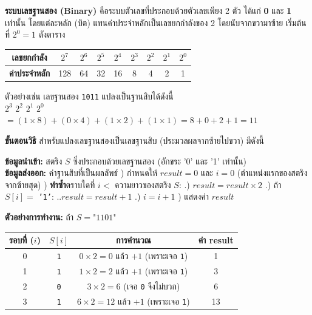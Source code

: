 \question \textbf{ระบบเลขฐานสอง (Binary)} คือระบบตัวเลขที่ประกอบด้วยตัวเลขเพียง 2 ตัว ได้แก่ \textbf{0} และ \textbf{1} เท่านั้น โดยแต่ละหลัก (บิต) แทนค่าประจำหลักเป็นเลขยกกำลังของ 2 โดยนับจากขวามาซ้าย เริ่มต้นที่ $2^0 = 1$ ดังตาราง

\begin{center}
\begin{tabular}{|c|*{8}{c|}}
\hline
\textbf{เลขยกกำลัง} & $2^7$ & $2^6$ & $2^5$ & $2^4$ & $2^3$ & $2^2$ & $2^1$ & $2^0$ \\
\hline
\textbf{ค่าประจำหลัก} & 128 & 64 & 32 & 16 & 8 & 4 & 2 & 1 \\
\hline
\end{tabular}
\end{center}

ตัวอย่างเช่น เลขฐานสอง \texttt{1011} แปลงเป็นฐานสิบได้ดังนี้ \\
\quad $2^3$\quad\;\; $2^2$\quad\;\; $2^1$\quad\;\; $2^0$ \\
\quad {}    \;\; $= (1 \times 8) + (0 \times 4) + (1 \times 2) + (1 \times 1) = 8 + 0 + 2 + 1 = 11$

\textbf{ขั้นตอนวิธี} สำหรับแปลงเลขฐานสองเป็นเลขฐานสิบ (ประมวลผลจากซ้ายไปขวา) มีดังนี้

\begin{pseudocode}
\textbf{ข้อมูลนำเข้า:} สตริง $S$ ซึ่งประกอบด้วยเลขฐานสอง (อักขระ '0' และ '1' เท่านั้น) \\
\textbf{ข้อมูลส่งออก:} ค่าฐานสิบที่เป็นผลลัพธ์
) กำหนดให้ $result = 0$ และ $i = 0$ (ตำแหน่งแรกของสตริง จากซ้ายสุด)
) \textbf{ทำซ้ำ}ตราบใดที่ $i <$ ความยาวของสตริง $S$:
\newline
.) $result = result \times 2$
\newline
.) ถ้า $S[i] =$ \texttt{'1'}:
\newline
.\quad.\qquad $result = result + 1$
\newline
.) $i = i + 1$
) แสดงค่า $result$
\end{pseudocode}

\textbf{ตัวอย่างการทำงาน:} ถ้า $S = \text{"1101"}$

\begin{center}
\begin{tabular}{|c|c|c|c|}
\hline
\textbf{รอบที่} ($i$) & $S[i]$ & \textbf{การคำนวณ} & \textbf{ค่า result} \\
\hline
0 & \texttt{1} & $0 \times 2 = 0$ แล้ว $+ 1$ (เพราะเจอ \texttt{1}) & 1 \\
1 & \texttt{1} & $1 \times 2 = 2$ แล้ว $+ 1$ (เพราะเจอ \texttt{1}) & 3 \\
2 & \texttt{0} & $3 \times 2 = 6$ (เจอ \texttt{0} จึงไม่บวก) & 6 \\
3 & \texttt{1} & $6 \times 2 = 12$ แล้ว $+ 1$ (เพราะเจอ \texttt{1}) & 13 \\
\hline
\end{tabular}
\end{center}

